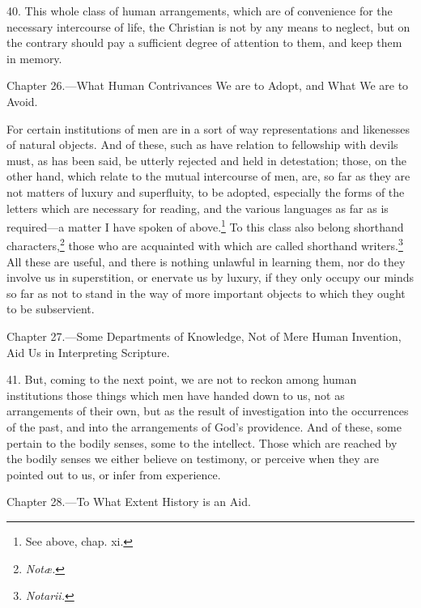 40. This whole class of human arrangements, which are of convenience for the necessary intercourse of life, the Christian is not by any means to neglect, but on the contrary should pay a sufficient degree of attention to them, and keep them in memory.


Chapter 26.—What Human Contrivances We are to Adopt, and What We are to Avoid.

For certain institutions of men are in a sort of way representations and likenesses of natural objects. And of these, such as have relation to fellowship with devils must, as has been said, be utterly rejected and held in detestation; those, on the other hand, which relate to the mutual intercourse of men, are, so far as they are not matters of luxury and superfluity, to be adopted, especially the forms of the letters which are necessary for reading, and the various languages as far as is required—a matter I have spoken of above.\footnote{See above, chap. xi.} To this class also belong shorthand characters,\footnote{\emph{Notæ.}} those who are acquainted with which are called shorthand writers.\footnote{\emph{Notarii.}} All these are useful, and there is nothing unlawful in learning them, nor do they involve us in superstition, or enervate us by luxury, if they only occupy our minds so far as not to stand in the way of more important objects to which they ought to be subservient.


Chapter 27.—Some Departments of Knowledge, Not of Mere Human Invention, Aid Us in Interpreting Scripture.

41. But, coming to the next point, we are not to reckon among human institutions those things which men have handed down to us, not as arrangements of their own, but as the result of investigation into the occurrences of the past, and into the arrangements of God’s providence. And of these, some pertain to the bodily senses, some to the intellect. Those which are reached by the bodily senses we either believe on testimony, or perceive when they are pointed out to us, or infer from experience.


Chapter 28.—To What Extent History is an Aid.

